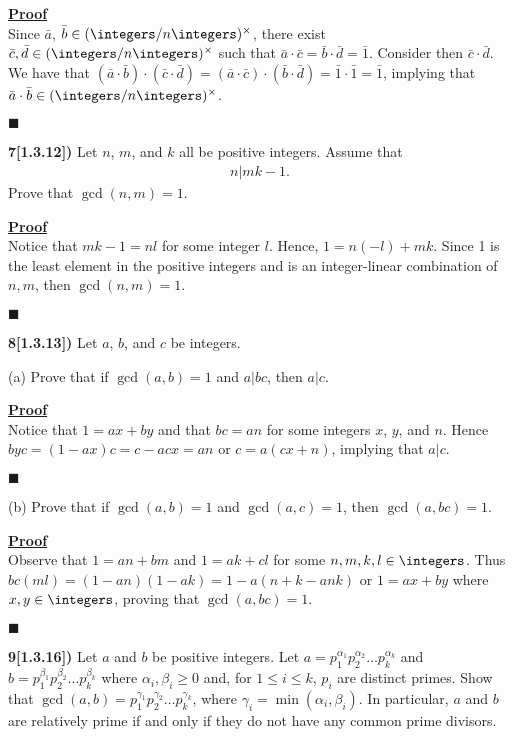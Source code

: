 \documentclass[12pt,a4paper]{article}
\newcommand{\prob}[2]{\textbf{#1)} #2}
\newenvironment{proof}
{
\textbf{\underline{Proof}} \\
}
{
\begin{flushright}
$\blacksquare$
\end{flushright}}
\begin{document}
\begin{proof}
Since $\bar{a}$, $\bar{b} \in (\integers/n\integers)^{\times}$, there exist $\bar{c},\bar{d} \in (\integers/n\integers)^{\times}$ such that $\bar{a} \cdot \bar{c} = \bar{b} \cdot \bar{d} = \bar{1}$. Consider then $\bar{c} \cdot \bar{d}$. We have that $(\bar{a} \cdot \bar{b}) \cdot (\bar{c} \cdot \bar{d}) = (\bar{a} \cdot \bar{c}) \cdot (\bar{b} \cdot \bar{d}) = \bar{1} \cdot \bar{1} = \bar{1}$, implying that $\bar{a} \cdot \bar{b} \in (\integers/n\integers)^{\times}$.
\end{proof}

\prob{7[1.3.12]}{Let $n$, $m$, and $k$ all be positive integers. Assume that 
\begin{align*}
n | mk-1.
\end{align*}
Prove that $\gcd(n,m) = 1$.}

\begin{proof}
Notice that $ mk-1 = nl$ for some integer $l$. Hence, $1 = n(-l) + mk$. Since 1 is the least element in the positive integers and is an integer-linear combination of $n,m$, then $\gcd(n,m) = 1$.
\end{proof}

\prob{8[1.3.13]}{Let $a$, $b$, and $c$ be integers.}

(a) Prove that if $\gcd(a,b) = 1$ and $a|bc$, then $a|c$.

\begin{proof}
Notice that $1 = ax+by$ and that $bc = an$ for some integers $x$, $y$, and $n$. Hence $byc = (1 - ax)c = c - acx = an$ or $c = a(cx + n)$, implying that $a|c$.
\end{proof}

(b) Prove that if $\gcd(a,b) = 1$ and $\gcd(a,c) = 1$, then $\gcd(a,bc) = 1$.

\begin{proof}
Observe that $1 = an + bm$ and $1 = ak + cl$ for some $n,m,k,l \in \integers$. Thus $bc(ml) = (1-an)(1-ak) = 1 - a(n + k - ank)$ or $1 = ax + by$ where $x,y \in \integers$, proving that $\gcd(a,bc) = 1$.
\end{proof}

\prob{9[1.3.16]}{Let $a$ and $b$ be positive integers. Let $a = p_1^{\alpha_1}p_2^{\alpha_2} \hdots p_k^{\alpha_k}$ and $b = p_1^{\beta_1}p_2^{\beta_2}\hdots p_k^{\beta_k}$ where $\alpha_i,\beta_i \geq 0$ and, for $1 \leq i \leq k$, $p_i$ are distinct primes. Show that $\gcd(a,b) = p_1^{\gamma_1}p_2^{\gamma_2}\hdots p_k^{\gamma_k}$, where $\gamma_i = \min(\alpha_i,\beta_i)$. In particular, $a$ and $b$ are relatively prime if and only if they do not have any common prime divisors.}
\end{document}
